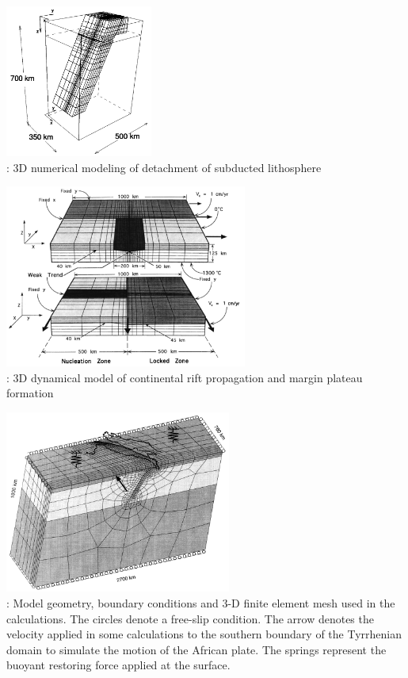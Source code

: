 \begin{center}
\begin{minipage}{0.45\textwidth}
\centering
\includegraphics[height=5cm]{images/history/yowo95}\\
{: 3D numerical modeling of detachment of subducted 
lithosphere \cite{yowo95}}
\end{minipage}\hfill
\begin{minipage}{0.45\textwidth}
\centering
\includegraphics[height=6cm]{images/history/dusa96}\\
{: 3D dynamical model of continental rift propagation and 
margin plateau formation \cite{dusa96}}
\end{minipage}
\end{center}



\begin{center}
\includegraphics[height=6cm]{images/history/nesb99}\\
{: Model geometry, boundary conditions and 3-D finite element mesh used in 
the calculations. The circles denote a free-slip condition. The arrow denotes the velocity 
applied in some calculations to the southern boundary of the Tyrrhenian domain to simulate 
the motion of the African plate. The springs represent the buoyant restoring force applied 
at the surface. \cite{nesb99}}
\end{center}




